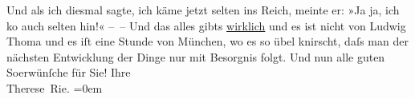 \begin{ledgroupsized}[t]{13cm}
           Und als ich diesmal sagte, ich käme jetzt selten ins Reich, meinte er: »Ja ja, ich ko{\geminationm} auch
                    selten hin!« – – Und das alles gibts \uline{wirklich}
                    und es ist nicht von Ludwig Thoma und es iſt
                    eine Stunde von München, wo {\pb}es so übel knirscht, daſs man der nächsten Entwicklung
                    der Dinge nur mit Besorgnis folgt.\pend
           \pstart
           Und nun alle guten So{\geminationm}erwünſche für Sie!\pend
           \pstart
           Ihre{\\[\baselineskip]}\spacefill\mbox{Therese Rie.}\pend
           \leftskip=0em{}          \endnumbering{}\end{ledgroupsized}  \newcommand{\dateiname}{L02573}\newcommand{\titel}{Therese Rie-Andro an Arthur Schnitzler, [Anfang Juli 1923]}\newcommand{\editorInnen}{Martin Anton Müller und Gerd-Hermann Susen}
      